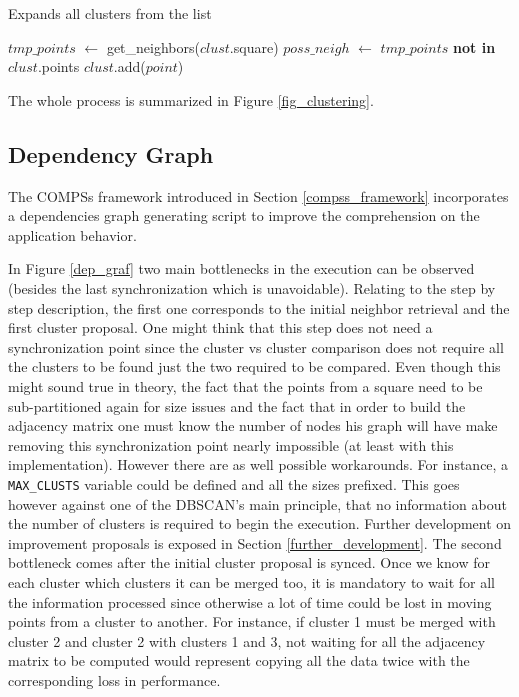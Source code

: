 \documentclass[10pt,journal,compsoc]{IEEEtran}
\let\MYoriglatexcaption\caption
\renewcommand{\caption}[2][\relax]{\MYoriglatexcaption[#2]{#2}}
\begin{document}
\begin{algorithm}
  \caption{Expands all clusters from the list \label{alg:expandClusters}}
  \begin{algorithmic}[1]
			\State $tmp\_points$ $\gets$ get\_neighbors($clust$.square)
            \State $poss\_neigh$ $\gets$ $tmp\_points$ \textbf{not in} $clust$.points
                	\State $clust$.add($point$)
               	\EndIf
          	\EndFor
        \EndFor
    \EndFunction
  \end{algorithmic}
\end{algorithm}


The whole process is summarized in Figure \ref{fig_clustering}.

\subsection{Dependency Graph}
The COMPSs framework introduced in Section \ref{compss_framework} incorporates a dependencies graph generating script to improve the comprehension on the application behavior. 

In Figure \ref{dep_graf} two main bottlenecks in the execution can be observed (besides the last synchronization which is unavoidable). Relating to the step by step description, the first one corresponds to the initial neighbor retrieval and the first cluster proposal. One might think that this step does not need a synchronization point since the cluster vs cluster comparison does not require all the clusters to be found just the two required to be compared. Even though this might sound true in theory, the fact that the points from a square need to be sub-partitioned again for size issues and the fact that in order to build the adjacency matrix one must know the number of nodes his graph will have make removing this synchronization point nearly impossible (at least with this implementation). However there are as well possible workarounds. For instance, a \texttt{MAX\_CLUSTS} variable could be defined and all the sizes prefixed. This goes however against one of the DBSCAN's main principle, that no information about the number of clusters is required to begin the execution. Further development on improvement proposals is exposed in Section \ref{further_development}. The second bottleneck comes after the initial cluster proposal is synced. Once we know for each cluster which clusters it can be merged too, it is mandatory to wait for all the information processed since otherwise a lot of time could be lost in moving points from a cluster to another. For instance, if cluster 1 must be merged with cluster 2 and cluster 2 with clusters 1 and 3, not waiting for all the adjacency matrix to be computed would represent copying all the data twice with the corresponding loss in performance.
\end{document}
